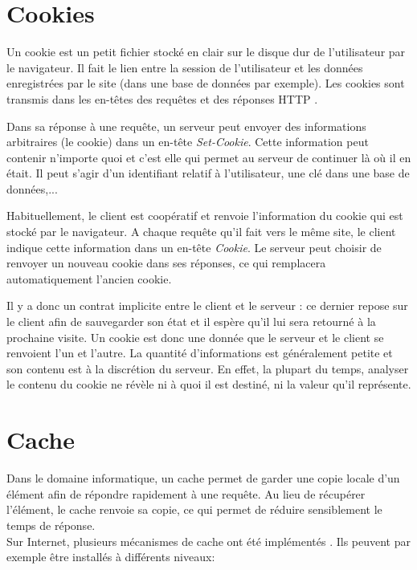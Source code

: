 	
\section{Cookies}
\label{cookies-expl}
Un cookie est un petit fichier stocké en clair sur le disque dur de l'utilisateur par le navigateur. Il fait le lien entre la session de l'utilisateur et les données enregistrées par le site (dans une base de données par exemple). Les cookies sont transmis dans les en-têtes des requêtes et des réponses HTTP \cite{Kristol:2001:HCS:502152.502153}.

Dans sa réponse à une requête, un serveur peut envoyer des informations arbitraires (le cookie) dans un en-tête \textit{Set-Cookie}. Cette information peut contenir n'importe quoi et c'est elle qui permet au serveur de continuer là où il en était. Il peut s'agir d'un identifiant relatif à l'utilisateur, une clé dans une base de données,...

Habituellement, le client est coopératif et renvoie l'information du cookie qui est stocké par le navigateur. A chaque requête qu'il fait vers le même site, le client indique cette information dans un en-tête \textit{Cookie}. Le serveur peut choisir de renvoyer un nouveau cookie dans ses réponses, ce qui remplacera automatiquement l'ancien cookie.
\newline

Il y a donc un contrat implicite entre le client et le serveur : ce dernier repose sur le client afin de sauvegarder son état et il espère qu'il lui sera retourné à la prochaine visite.
Un cookie est donc une donnée que le serveur et le client se renvoient l'un et l'autre. La quantité d'informations est généralement petite et son contenu est à la discrétion du serveur. En effet, la plupart du temps, analyser le contenu du cookie ne révèle ni à quoi il est destiné, ni la valeur qu'il représente.


\section{Cache}
\label{cache-expl}
Dans le domaine informatique, un cache permet de garder une copie locale d'un élément afin de répondre rapidement à une requête. Au lieu de récupérer l'élément, le cache renvoie sa copie, ce qui permet de réduire sensiblement le temps de réponse.\\
Sur Internet, plusieurs mécanismes de cache ont été implémentés \cite{WikipediaEN_Web_cache}. Ils peuvent par exemple être installés à différents niveaux:

